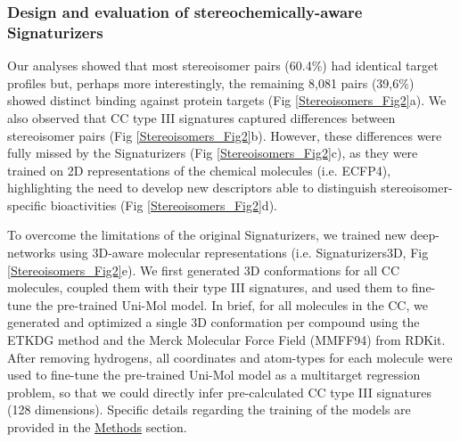 
\subsubsection{Design and evaluation of stereochemically-aware Signaturizers}
\label{Stereoisomers_Design_Evaluation_Signaturizers}

Our analyses showed that most stereoisomer pairs (60.4\%) had identical target profiles but, perhaps more interestingly, the remaining 8,081 pairs (39,6\%) showed distinct binding against protein targets (Fig \ref{Stereoisomers_Fig2}a). We also observed that CC type III signatures captured differences between stereoisomer pairs (Fig \ref{Stereoisomers_Fig2}b). However, these differences were fully missed by the Signaturizers (Fig \ref{Stereoisomers_Fig2}c), as they were trained on 2D representations of the chemical molecules (i.e. ECFP4\cite{rogers_extended-connectivity_2010}), highlighting the need to develop new descriptors able to distinguish stereoisomer-specific bioactivities (Fig \ref{Stereoisomers_Fig2}d).

To overcome the limitations of the original Signaturizers, we trained new deep-networks using 3D-aware molecular representations (i.e. Signaturizers3D, Fig \ref{Stereoisomers_Fig2}e). We first generated 3D conformations for all CC molecules, coupled them with their type III signatures, and used them to fine-tune the pre-trained Uni-Mol model\cite{zhou_uni-mol_2023}. In brief, for all molecules in the CC, we generated and optimized a single 3D conformation per compound using the ETKDG method\cite{riniker_better_2015} and the Merck Molecular Force Field (MMFF94) from RDKit. After removing hydrogens, all coordinates and atom-types for each molecule were used to fine-tune the pre-trained Uni-Mol model as a multitarget regression problem, so that we could directly infer pre-calculated CC type III signatures (128 dimensions). Specific details regarding the training of the models are provided in the \hyperref[Stereoisomers_Methods]{Methods} section. 


